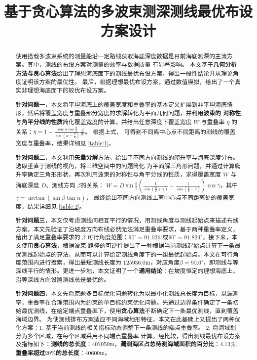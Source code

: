 \documentclass[withoutpreface,bwprint]{cumcmthesis} %
\title{基于贪心算法的多波束测深测线最优布设方案设计}
\begin{document}
        \maketitle
        \begin{abstract}
            使用搭载多波束系统的测量船沿一定路线获取海底深度数据是目前海底测深的主流方案。其中，测线的布设方案对测量的效率与数据质量
            有显著影响。
            本文基于\textbf{几何分析方法与贪心算法}给出了理想海底面下的测线最优布设方案，得出一般性结论并从理论角度证明该方案的最优性。
            最后，根据理想最优布设方案，通过数值模拟，给出了一个真实非理想海底面下的较优布设方案。

        \textbf{针对问题一}，本文将平坦海底上的覆盖宽度和重叠率的基本定义扩展到非平坦海底情形，然后将覆盖宽度与重叠部分宽度的求解转化为平面几何问题，并利用\textbf{波束的
        对称性}与\textbf{角平分线的性质}简化覆盖宽度的计算，并给出任意深度下覆盖宽度 $W$ 与重叠率 $\eta$ 的关系：$ \eta = 1 - \frac{\cos\alpha\cos\frac{\theta}{2}}{\cos(\alpha - \frac{\theta}{2})}\frac{d}{W}$。
        根据上式，
        可得到不同离中心点不同距离的测线的覆盖宽度与重叠率，结果详细见 \cref{table:1}。

        \textbf{针对问题二}，本文利用\textbf{矢量分解}方法，给出了不同方向测线的爬升率与海底深度分布。选取垂直于测线的视角，将三维空间中的问题简化
        为平面解三角形问题，并通过计算爬升率确定三角形形状，再次利用波束的对称性与角平分线的性质，求得覆盖宽度 $W$ 与海底深度 $D$、测线方向 $\beta$的关系：
        $W = D\sin\frac{\theta}{2}(\frac{1}{\cos(\frac{\theta}{2}+\gamma)} + \frac{1}{\cos(\frac{\theta}{2} - \gamma)})\cos\gamma$，其中 $\gamma = \arctan(\sin\beta\tan\alpha)$，
        最终给出不同方向测线上离中心点不同距离处的覆盖宽度，结果详细见 \cref{table:2}。
        
        \textbf{针对问题三}，本文仅考虑测线间相互平行的情况，用测线角度与测线起始点来描述布线方案。本文先验证了沿坡度方向布线必然无法满足重叠率要求，基于两种重叠率定义，
        给出了满足重叠率要求的 $\beta$ 可行角度范围：$90^\circ\sim 91.026^\circ$或$90^\circ\sim 91.824^\circ$。接下来，本文使用\textbf{贪心算法}，根据波束
        路径的可逆性提出了一种根据当前测线起始点计算下一条最优测线起始点的算法，从而可以计算给定测线角度下的一组最优起始点。本文在可行角度范围内进行搜索，得出最短测线长度为
        $125936.0$m，对应角度$ \beta = 90.0^\circ$，即测线与等深线平行的情形。更进一步地，本文证明了一个\textbf{通用结论}：在坡度恒定的理想海底上，沿等深线方向设置测线总是最优的。
        
        \textbf{针对问题四}，本文先将原题多目标优化问题转化为以最小化测线总长度为目标，以漏测率，重叠率在合理范围内为约束的单目标约束优化问题。先通过边界条件确定了一条初始最优测线，在给定端点重叠率下，使用\textbf{贪心算法}不断确定下一条最优测线，直到覆盖海域边界。
        为使测线排布方案适应不同海域地形特征，本文在此基础上又提出了两种优化方案：1. 基于当前测线的相关指标动态调整下一条测线的端点重叠率。 2. 将海域划分为多个区域，在每个区域采用不同端点重叠率
        计算。经比较，得出测线最优布设方案及指标如下：\textbf{测线的总长度}：$407050$m，\textbf{漏测海区占总待测海域面积的百分比}：$4.73\%$,\textbf{重叠率超过$20\%$的总长度}：$40600$m。




\end{abstract}
\end{document}
